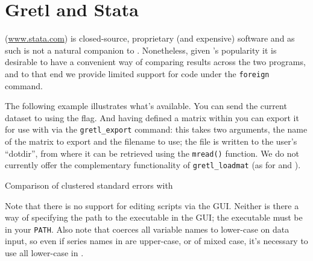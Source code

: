 \chapter{Gretl and Stata}
\label{chap:gretlStata}

 (\url{www.stata.com}) is closed-source, proprietary (and
expensive) software and as such is not a natural companion to
. Nonetheless, given 's popularity it is
desirable to have a convenient way of comparing results across the two
programs, and to that end we provide limited support for 
code under the \texttt{foreign} command.

The following example illustrates what's available. You can send the
current  dataset to  using the
 flag. And having defined a matrix within
 you can export it for use with  via the
\verb|gretl_export| command: this takes two arguments, the name of the
matrix to export and the filename to use; the file is written to the
user's ``dotdir'', from where it can be retrieved using the
\texttt{mread()} function. We do not currently offer the complementary
functionality of \verb|gretl_loadmat| (as for  and
).


\begin{script}[htbp]
  \caption{Comparison of clustered standard errors with }
\label{Stata-test}
\end{script}

Note that there is no support for editing  scripts via the
 GUI. Neither is there a way of specifying the path to the
 executable in the  GUI; the executable must be
in your \texttt{PATH}. Also note that  coerces all variable
names to lower-case on data input, so even if series names in
 are upper-case, or of mixed case, it's necessary to use
all lower-case in . 


